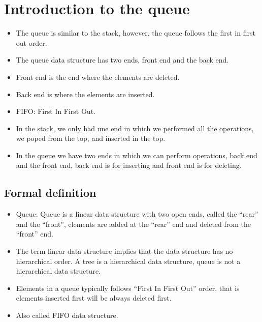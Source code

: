 \section{Introduction to the queue}
\begin{itemize}
    \item The queue is similar to the stack, however, the queue follows the first in first out order.
    \item The queue data structure has two ends, front end and the back end.
    \item Front end is the end where the elements are deleted.
    \item Back end is where the elements are inserted.
    \item FIFO: First In First Out. 
    \item In the stack, we only had une end in which we performed all the operations, we poped from the top, and inserted in the top. 
    \item In the queue we have two ends in which we can perform operations, back end and the front end, back end is for inserting and front end is for deleting. 
\end{itemize}

\subsection{Formal definition}
\begin{itemize}
    \item Queue: Queue is a linear data structure with two open ends, called the ``rear'' and the ``front'', elements are added at the ``rear'' end and deleted from the ``front'' end. 
    \item The term linear data structure implies that the data structure has no hierarchical order. A tree is a hierarchical data structure, queue is not a hierarchical data structure. 
    \item Elements in a queue typically follows ``First In First Out'' order, that is elements inserted first will be always deleted first. 
    \item Also called FIFO data structure. 
\end{itemize}

